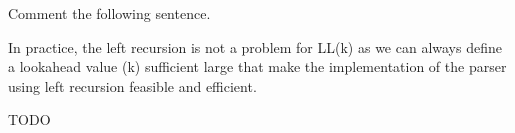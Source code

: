 \documentclass[docid=2021]{comp_exam_round1}
\begin{document}
\vspace{-1em}
\begin{center}
    \ttfamily\small
\end{center}

\examgroup{}

Comment the following sentence.

\question
In practice, the left recursion is not a problem for LL(k) as we can always define a lookahead value (k) sufficient large that make the implementation of the parser using left recursion feasible and efficient.

\ansseparator

TODO

\newpage

\examgroup{}
\end{document}
